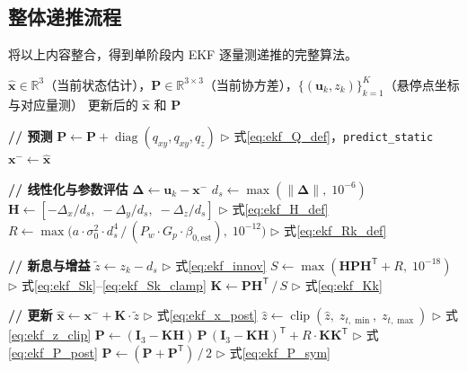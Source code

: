 \subsection{整体递推流程}

将以上内容整合，得到单阶段内 EKF 逐量测递推的完整算法。

\begin{algorithm}[htbp]
\caption{逐量测 EKF 递推（对应 \texttt{ekf.update\_one}）}
\label{alg:ekf}
\begin{algorithmic}[1]
\REQUIRE $\hat{\mathbf{x}} \in \mathbb{R}^3$（当前状态估计），$\mathbf{P} \in \mathbb{R}^{3 \times 3}$（当前协方差），$\{(\mathbf{u}_k, z_k)\}_{k=1}^{K}$（悬停点坐标与对应量测）
\ENSURE 更新后的 $\hat{\mathbf{x}}$ 和 $\mathbf{P}$

    \STATE \textbf{// 预测}
    \STATE $\mathbf{P} \leftarrow \mathbf{P} + \operatorname{diag}(q_{xy}, q_{xy}, q_z)$ \quad $\triangleright$ 式\eqref{eq:ekf_Q_def}，\texttt{predict\_static}
    \STATE $\mathbf{x}^{-} \leftarrow \hat{\mathbf{x}}$

    \STATE \textbf{// 线性化与参数评估}
    \STATE $\bm{\Delta} \leftarrow \mathbf{u}_k - \mathbf{x}^{-}$
    \STATE $d_s \leftarrow \max(\|\bm{\Delta}\|,\; 10^{-6})$
    \STATE $\mathbf{H} \leftarrow [-\Delta_x/d_s,\; -\Delta_y/d_s,\; -\Delta_z/d_s]$ \quad $\triangleright$ 式\eqref{eq:ekf_H_def}
    \STATE $R \leftarrow \max\!\bigl(a \cdot \sigma_0^2 \cdot d_s^4 \,/\, (P_w \cdot G_p \cdot \beta_{0,\text{est}}),\; 10^{-12}\bigr)$ \quad $\triangleright$ 式\eqref{eq:ekf_Rk_def}

    \STATE \textbf{// 新息与增益}
    \STATE $\tilde{z} \leftarrow z_k - d_s$ \quad $\triangleright$ 式\eqref{eq:ekf_innov}
    \STATE $S \leftarrow \max(\mathbf{H}\mathbf{P}\mathbf{H}^{\mathsf{T}} + R,\; 10^{-18})$ \quad $\triangleright$ 式\eqref{eq:ekf_Sk}--\eqref{eq:ekf_Sk_clamp}
    \STATE $\mathbf{K} \leftarrow \mathbf{P}\mathbf{H}^{\mathsf{T}} \,/\, S$ \quad $\triangleright$ 式\eqref{eq:ekf_Kk}

    \STATE \textbf{// 更新}
    \STATE $\hat{\mathbf{x}} \leftarrow \mathbf{x}^{-} + \mathbf{K} \cdot \tilde{z}$ \quad $\triangleright$ 式\eqref{eq:ekf_x_post}
    \STATE $\hat{z} \leftarrow \operatorname{clip}(\hat{z},\; z_{t,\min},\; z_{t,\max})$ \quad $\triangleright$ 式\eqref{eq:ekf_z_clip}
    \STATE $\mathbf{P} \leftarrow (\mathbf{I}_3 - \mathbf{K}\mathbf{H})\,\mathbf{P}\,(\mathbf{I}_3 - \mathbf{K}\mathbf{H})^{\mathsf{T}} + R \cdot \mathbf{K}\mathbf{K}^{\mathsf{T}}$ \quad $\triangleright$ 式\eqref{eq:ekf_P_post}
    \STATE $\mathbf{P} \leftarrow (\mathbf{P} + \mathbf{P}^{\mathsf{T}}) \,/\, 2$ \quad $\triangleright$ 式\eqref{eq:ekf_P_sym}
\ENDFOR
\end{algorithmic}
\end{algorithm}

